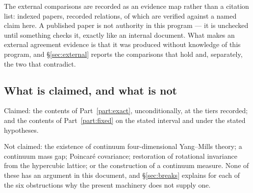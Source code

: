 The external comparisons are recorded as an evidence map rather than a
citation list: \LitPapers{} indexed papers, \LitEdges{} recorded
relations, of which \LitVerified{} are verified against a named claim
here. A published paper is not authority in this program --- it is
unchecked until something checks it, exactly like an internal document.
What makes an external agreement evidence is that it was produced
without knowledge of this program, and \S\ref{sec:external} reports the
comparisons that hold and, separately, the two that contradict.

\subsection{What is claimed, and what is not}

Claimed: the contents of Part~\ref{part:exact}, unconditionally, at the
tiers recorded; and the contents of Part~\ref{part:fixed} on the stated
interval and under the stated hypotheses.

Not claimed: the existence of continuum four-dimensional Yang--Mills
theory; a continuum mass gap; Poincar\'e covariance; restoration of
rotational invariance from the hypercubic lattice; or the construction of
a continuum measure. None of these has an argument in this document, and
\S\ref{sec:breaks} explains for each of the six obstructions why the
present machinery does not supply one.
